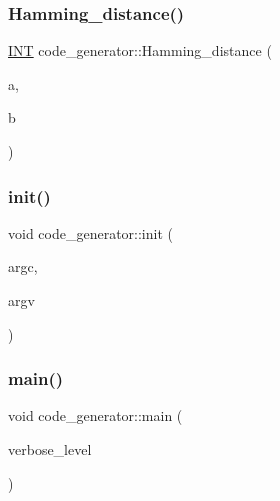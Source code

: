 \mbox{\label{classcode__generator_a6ae1b16555e2126c58bba83c8fa3bb23}} 
\subsubsection{\texorpdfstring{Hamming\+\_\+distance()}{Hamming\_distance()}}
{\footnotesize\ttfamily \mbox{\hyperlink{galois_8h_a09fddde158a3a20bd2dcadb609de11dc}{I\+NT}} code\+\_\+generator\+::\+Hamming\+\_\+distance (\begin{DoxyParamCaption}\item[{\mbox{\hyperlink{galois_8h_a09fddde158a3a20bd2dcadb609de11dc}{I\+NT}}}]{a,  }\item[{\mbox{\hyperlink{galois_8h_a09fddde158a3a20bd2dcadb609de11dc}{I\+NT}}}]{b }\end{DoxyParamCaption})}

\mbox{\label{classcode__generator_acfaa1e8badf6f30255203f499b130af8}} 
\subsubsection{\texorpdfstring{init()}{init()}}
{\footnotesize\ttfamily void code\+\_\+generator\+::init (\begin{DoxyParamCaption}\item[{int}]{argc,  }\item[{const char $\ast$$\ast$}]{argv }\end{DoxyParamCaption})}

\mbox{\label{classcode__generator_ab3cf3a306e4032c2b471ac95321c599f}} 
\subsubsection{\texorpdfstring{main()}{main()}}
{\footnotesize\ttfamily void code\+\_\+generator\+::main (\begin{DoxyParamCaption}\item[{\mbox{\hyperlink{galois_8h_a09fddde158a3a20bd2dcadb609de11dc}{I\+NT}}}]{verbose\+\_\+level }\end{DoxyParamCaption})}

